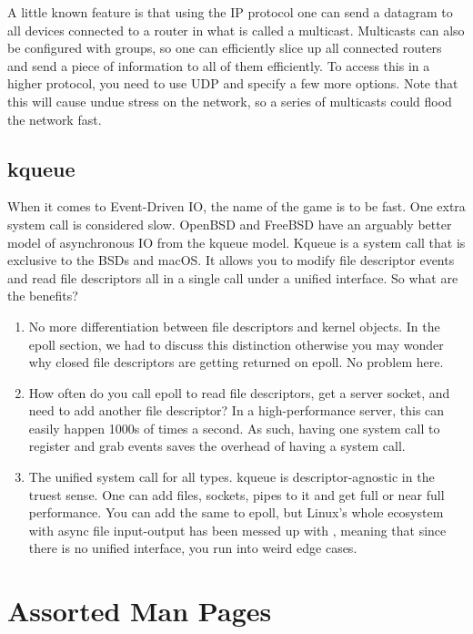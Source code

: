 A little known feature is that using the IP protocol one can send a datagram to all devices connected to a router in what is called a multicast.
Multicasts can also be configured with groups, so one can efficiently slice up all connected routers and send a piece of information to all of them efficiently.
To access this in a higher protocol, you need to use UDP and specify a few more options.
Note that this will cause undue stress on the network, so a series of multicasts could flood the network fast.


\subsection{kqueue}

When it comes to Event-Driven IO, the name of the game is to be fast.
One extra system call is considered slow.
OpenBSD and FreeBSD have an arguably better model of asynchronous IO from the kqueue model.
Kqueue is a system call that is exclusive to the BSDs and macOS.
It allows you to modify file descriptor events and read file descriptors all in a single call under a unified interface.
So what are the benefits?

\begin{enumerate}
\item No more differentiation between file descriptors and kernel objects. In the epoll section, we had to discuss this distinction otherwise you may wonder why closed file descriptors are getting returned on epoll. No problem here.
\item How often do you call epoll to read file descriptors, get a server socket, and need to add another file descriptor?
  In a high-performance server, this can easily happen 1000s of times a second.
  As such, having one system call to register and grab events saves the overhead of having a system call.
\item The unified system call for all types.
  kqueue is descriptor-agnostic in the truest sense.
  One can add files, sockets, pipes to it and get full or near full performance.
  You can add the same to epoll, but Linux's whole ecosystem with async file input-output has been messed up with , meaning that since there is no unified interface, you run into weird edge cases.
\end{enumerate}



\section{Assorted Man Pages}

